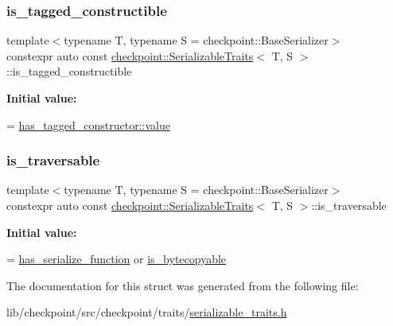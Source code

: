 \subsubsection{\texorpdfstring{is\+\_\+tagged\+\_\+constructible}{is\_tagged\_constructible}}
{\footnotesize\ttfamily template$<$typename T, typename S = checkpoint\+::\+Base\+Serializer$>$ \\
constexpr auto const \hyperlink{structcheckpoint_1_1_serializable_traits}{checkpoint\+::\+Serializable\+Traits}$<$ T, S $>$\+::is\+\_\+tagged\+\_\+constructible\hspace{0.3cm}{\ttfamily [static]}}

{\bfseries Initial value\+:}
\begin{DoxyCode}
=
    \hyperlink{structdetection_1_1detector_a6d7d0e1bdf5903db9edbe448edccf83b}{has\_tagged\_constructor::value}
\end{DoxyCode}
\mbox{\label{structcheckpoint_1_1_serializable_traits_a426639501cd0ce23cb14c7b2ff982fc1}} 
\subsubsection{\texorpdfstring{is\+\_\+traversable}{is\_traversable}}
{\footnotesize\ttfamily template$<$typename T, typename S = checkpoint\+::\+Base\+Serializer$>$ \\
constexpr auto const \hyperlink{structcheckpoint_1_1_serializable_traits}{checkpoint\+::\+Serializable\+Traits}$<$ T, S $>$\+::is\+\_\+traversable\hspace{0.3cm}{\ttfamily [static]}}

{\bfseries Initial value\+:}
\begin{DoxyCode}
=
    \hyperlink{structcheckpoint_1_1_serializable_traits_a4d17a7627a8e033cccb5cf4e6b8fd0dc}{has\_serialize\_function} or \hyperlink{structcheckpoint_1_1_serializable_traits_a19e58ea0f510be10502e476258ed14ae}{is\_bytecopyable}
\end{DoxyCode}


The documentation for this struct was generated from the following file\+:\begin{DoxyCompactItemize}
\item 
lib/checkpoint/src/checkpoint/traits/\hyperlink{serializable__traits_8h}{serializable\+\_\+traits.\+h}\end{DoxyCompactItemize}
